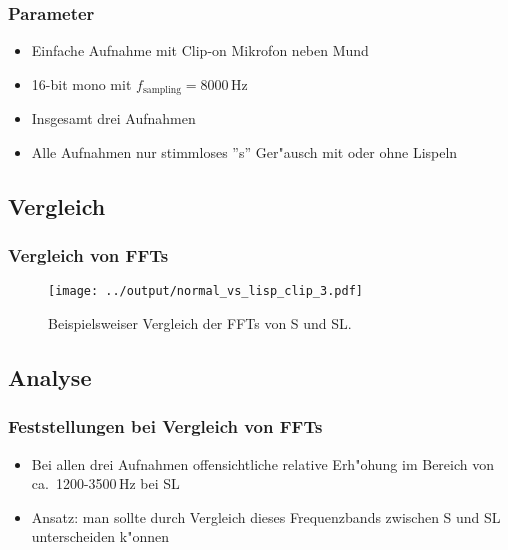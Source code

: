 \documentclass[11pt]{beamer}
\begin{document}
\begin{frame}
\frametitle{Parameter}
\begin{itemize}
\item Einfache Aufnahme mit Clip-on Mikrofon neben Mund
\item 16-bit mono mit $f_\mathrm{sampling}=8000$\,Hz
\item Insgesamt drei Aufnahmen
\item Alle Aufnahmen nur stimmloses ''s'' Ger"ausch mit oder ohne Lispeln
\end{itemize}
\end{frame}

\subsection{Vergleich}

\begin{frame}
\frametitle{Vergleich von FFTs}
\begin{figure}
\texttt{[image: ../output/normal\_vs\_lisp\_clip\_3.pdf]}
\caption{Beispielsweiser Vergleich der FFTs von S und SL.}
\end{figure}
\end{frame}

\subsection{Analyse}

\begin{frame}
\frametitle{Feststellungen bei Vergleich von FFTs}
\begin{itemize}
\item Bei allen drei Aufnahmen offensichtliche relative Erh"ohung im Bereich von ca.\ 1200-3500\,Hz bei SL
\item Ansatz: man sollte durch Vergleich dieses Frequenzbands zwischen S und SL unterscheiden k"onnen
\end{itemize}
\end{frame}
\end{document}
